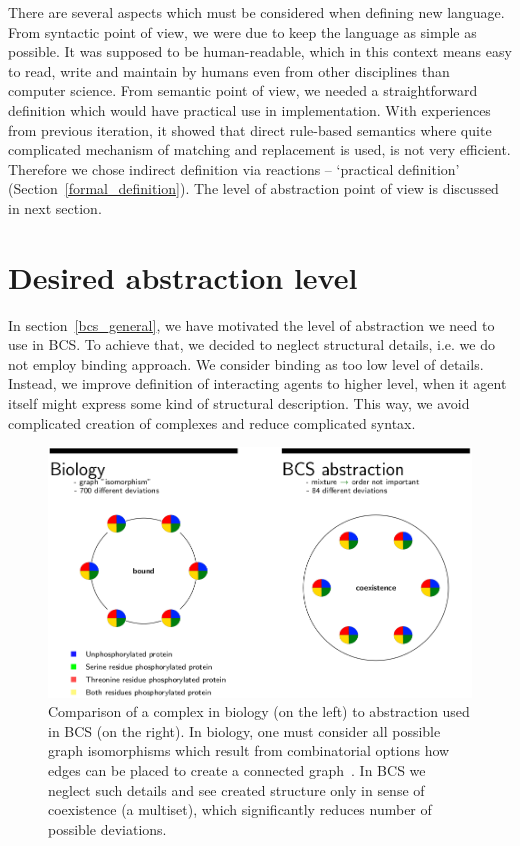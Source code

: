 \documentclass[12pt]{fithesis2}
\begin{document}
There are several aspects which must be considered when defining new language. From syntactic point of view, we were due to keep the language as simple as possible. It was supposed to be human-readable, which in this context means easy to read, write and maintain by humans even from other disciplines than computer science. From semantic point of view, we needed a straightforward definition which would have practical use in implementation. With experiences from previous iteration, it showed that direct rule-based semantics where quite complicated mechanism of matching and replacement is used, is not very efficient. Therefore we chose indirect definition via reactions -- `practical definition' (Section~\ref{formal_definition}). The level of abstraction point of view is discussed in next section.

\section{Desired abstraction level}

In section~\ref{bcs_general}, we have motivated the level of abstraction we need to use in BCS. To achieve that, we decided to neglect structural details, i.e. we do not employ binding approach. We consider binding as too low level of details. Instead, we improve definition of interacting agents to higher level, when it agent itself might express some kind of structural description. This way, we avoid complicated creation of complexes and reduce complicated syntax.

\begin{figure}[!h]
\begin{center}
  \includegraphics[scale=0.35]{pics/abstraction}
\end{center}
\caption{Comparison of a complex in biology (on the left) to abstraction used in BCS (on the right). In biology, one must consider all possible graph isomorphisms which result from combinatorial options how edges can be placed to create a connected graph~\cite{Chartrand1985}. In BCS we neglect such details and see created structure only in sense of coexistence (a multiset), which significantly reduces number of possible deviations.}\label{abstraction_comparision}
\end{figure}
\end{document}
